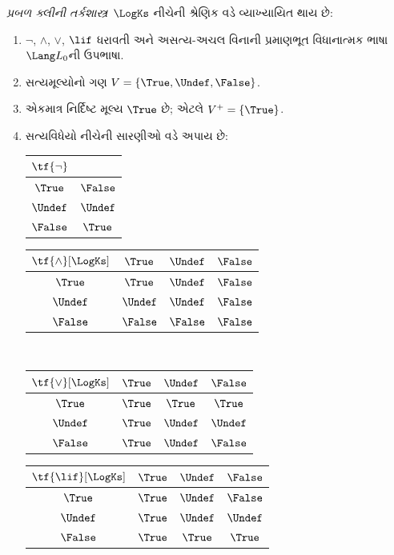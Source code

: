 \documentclass[../../../include/open-logic-section]{subfiles}
\begin{document}
\begin{defn}
\emph{પ્રબળ ક્લીની તર્કશાસ્ત્ર}~$\LogKs$ નીચેની શ્રેણિક વડે વ્યાખ્યાયિત થાય છે:
\begin{enumerate}
  \item $\lnot$, $\land$, $\lor$, $\lif$ ધરાવતી અને
  અસત્ય-અચલ વિનાની પ્રમાણભૂત વિધાનાત્મક ભાષા~$\Lang L_0$ની ઉપભાષા.
  \item સત્યમૂલ્યોનો ગણ $V = \{\True, \Undef, \False\}$.
  \item એકમાત્ર નિર્દિષ્ટ મૂલ્ય $\True$ છે; એટલે $V^+ = \{\True\}$.
  \item સત્યવિધેયો નીચેની સારણીઓ વડે અપાય છે:
  \begin{center}
    \begin{tabular}{c|c}
      $\tf{\lnot}$ & \\
      \hline
      $\True$ & $\False$ \\
      $\Undef$ & $\Undef$ \\
      $\False$ & $\True$
    \end{tabular}
    \quad
    \begin{tabular}{c|ccc}
      $\tf{\land}[\LogKs]$ & $\True$ & $\Undef$ & $\False$ \\
      \hline
      $\True$ & $\True$ & $\Undef$ & $\False$ \\
      $\Undef$ & $\Undef$ & $\Undef$ & $\False$\\
      $\False$ & $\False$ & $\False$ & $\False$
    \end{tabular}
    \\[2ex]
    \begin{tabular}{c|ccc}
      $\tf{\lor}[\LogKs]$ & $\True$ & $\Undef$ & $\False$ \\
      \hline
      $\True$ & $\True$ & $\True$ & $\True$ \\
      $\Undef$ & $\True$ & $\Undef$ & $\Undef$ \\
      $\False$ & $\True$ & $\Undef$ & $\False$
    \end{tabular}
    \quad
    \begin{tabular}{c|ccc}
      $\tf{\lif}[\LogKs]$ & $\True$ & $\Undef$ & $\False$ \\
      \hline
      $\True$ & $\True$ & $\Undef$ & $\False$ \\
      $\Undef$ & $\True$ & $\Undef$ & $\Undef$ \\
      $\False$ & $\True$ & $\True$ & $\True$
    \end{tabular}
  \end{center}
\end{enumerate}
\end{defn}
\end{document}

